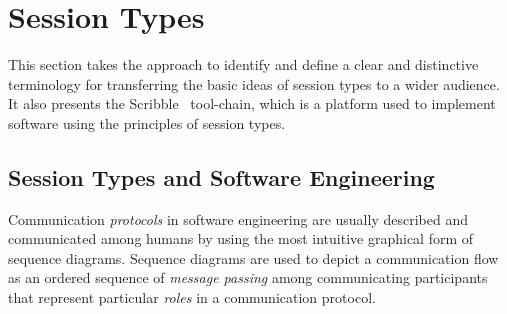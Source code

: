 
\section{Session Types}
\label{sec:session_types}


This section takes the approach to identify and define
a clear and distinctive terminology
for transferring the basic ideas of session types to a wider audience.
It also presents the Scribble~\cite{scribble}%
tool-chain, which is a platform used to implement
software using the principles of session types.

\subsection{Session Types and Software Engineering}%
\label{sec:sessions_software}



Communication \emph{protocols} in software engineering
are usually described and communicated among humans
by using the most intuitive graphical form of sequence diagrams.
Sequence diagrams are used to depict a communication flow as an ordered
sequence of \emph{message passing} among communicating
participants that represent particular \emph{roles} in a communication
protocol.

